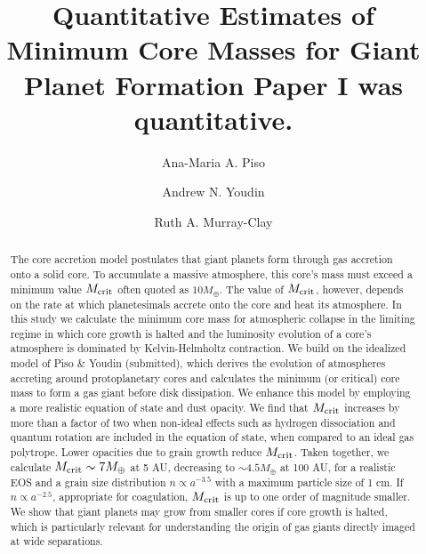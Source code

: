\documentclass[apj]{emulateapj}
\begin{document}



\title{Quantitative Estimates of Minimum Core Masses for Giant Planet Formation
{\bf Paper I was quantitative.}}
\author{Ana-Maria A. Piso}
\author{Andrew N. Youdin}
\author{Ruth A. Murray-Clay}

\begin{abstract}

The core accretion model postulates that giant planets form through gas accretion onto a solid core. To accumulate a massive atmosphere, this core's mass must exceed a minimum value $M_{\rm crit}$ often quoted as $10 M_{\oplus}$. The value of $M_{\rm crit}$, however, depends on the rate at which planetesimals accrete onto the core and heat its atmosphere. In this study we calculate the minimum core mass for atmospheric collapse in the limiting regime in which core growth is halted and the luminosity evolution of a core's atmosphere is dominated by Kelvin-Helmholtz contraction. We build on the idealized model of Piso \& Youdin (submitted), which derives the evolution of atmospheres accreting around protoplanetary cores and calculates the minimum (or critical) core mass to form a gas giant before disk dissipation. We enhance this model by employing a more realistic equation of state and dust opacity. We find that $M_{\rm crit}$ increases by more than a factor of two when non-ideal effects such as hydrogen dissociation and quantum rotation are included in the equation of state, when compared to an ideal gas polytrope. Lower opacities due to grain growth reduce $M_{\rm crit}$. Taken together, we calculate $M_{\rm crit} \sim 7 M_{\oplus}$ at 5 AU, decreasing to $\sim$$4.5 M_{\oplus}$ at 100 AU, for a realistic EOS and a grain size distribution $n \propto a^{-3.5}$ with a maximum particle size of 1 cm. If $n \propto a^{-2.5}$, appropriate for coagulation, $M_{\rm crit}$ is up to one order of magnitude smaller. We show that giant planets may grow from smaller cores if core growth is halted, which is particularly relevant for understanding the origin of gas giants directly imaged at wide separations.  



\end{abstract}
\end{document}
